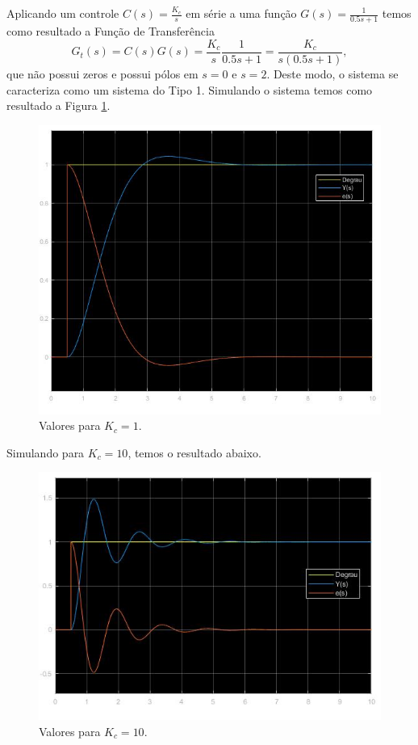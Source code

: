 \documentclass[
]{book}
\theoremstyle{definition}
\theoremstyle{definition}
\theoremstyle{definition}
\theoremstyle{remark}
\begin{document}
Aplicando um controle \(C(s) = \frac {K_c}{s}\) em série a uma função \(G(s) = \frac {1}{0.5s+1}\) temos como resultado a Função de Transferência\\
\[
G_t(s) = C(s)G(s) = \frac {K_c}{s} \frac{1}{0.5s+1} = \frac {K_c}{s(0.5s+1)},
\]
que não possui zeros e possui pólos em \(s = 0\) e \(s = 2\). Deste modo, o sistema se caracteriza como um sistema do Tipo 1. Simulando o sistema temos como resultado a Figura \ref{fig:fig42A1}.

\begin{figure}
\includegraphics[width=0.8\linewidth]{Imagens/Lab4/Resolução/prob2A1} \caption{Valores para $K_c = 1$.}\label{fig:fig42A1}
\end{figure}

Simulando para \(K_c = 10\), temos o resultado abaixo.

\begin{figure}
\includegraphics[width=0.8\linewidth]{Imagens/Lab4/Resolução/prob2A2} \caption{Valores para $K_c = 10$.}\label{fig:fig42A2}
\end{figure}
\end{document}
